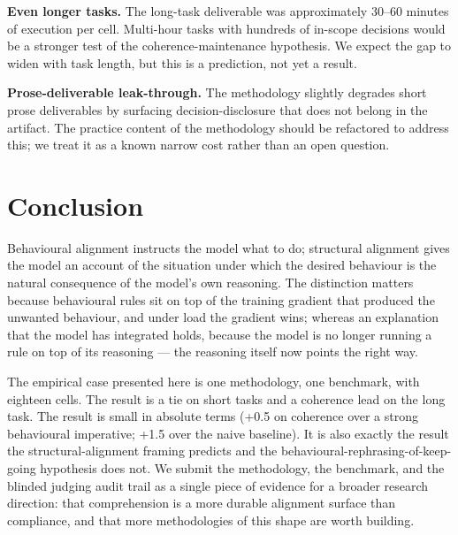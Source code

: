 \documentclass[11pt]{article}
\begin{document}
\textbf{Even longer tasks.} The long-task deliverable was approximately
30--60 minutes of execution per cell. Multi-hour tasks with hundreds of
in-scope decisions would be a stronger test of the coherence-maintenance
hypothesis. We expect the gap to widen with task length, but this is a
prediction, not yet a result.

\textbf{Prose-deliverable leak-through.} The methodology slightly degrades
short prose deliverables by surfacing decision-disclosure that does not
belong in the artifact. The practice content of the methodology should be
refactored to address this; we treat it as a known narrow cost rather
than an open question.

\section{Conclusion}

Behavioural alignment instructs the model what to do; structural alignment
gives the model an account of the situation under which the desired
behaviour is the natural consequence of the model's own reasoning. The
distinction matters because behavioural rules sit on top of the training
gradient that produced the unwanted behaviour, and under load the
gradient wins; whereas an explanation that the model has integrated holds,
because the model is no longer running a rule on top of its reasoning ---
the reasoning itself now points the right way.

The empirical case presented here is one methodology, one benchmark, with
eighteen cells. The result is a tie on short tasks and a coherence lead on
the long task. The result is small in absolute terms (+0.5 on coherence
over a strong behavioural imperative; +1.5 over the naive baseline). It is
also exactly the result the structural-alignment framing predicts and the
behavioural-rephrasing-of-keep-going hypothesis does not. We submit the
methodology, the benchmark, and the blinded judging audit trail as a
single piece of evidence for a broader research direction: that
comprehension is a more durable alignment surface than compliance, and
that more methodologies of this shape are worth building.



\end{document}
